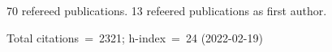 70 refereed publications. 13 refeered publications as first author.

Total citations~=~2321; h-index~=~24 (2022-02-19)